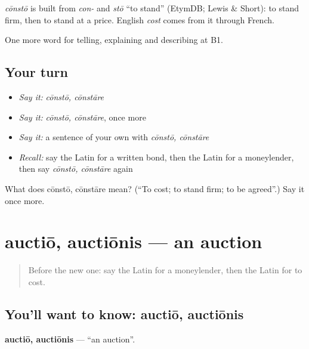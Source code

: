 \begin{cousinweb}
\emph{cōnstō} is built from \emph{con-} and \emph{stō} \textquotedblleft{}to stand\textquotedblright{} (EtymDB; Lewis \& Short): to stand firm, then to stand at a price. English \emph{cost} comes from it through French.
\end{cousinweb}

\begin{grammarlens}[title={What you've built}]
One more word for telling, explaining and describing at B1.
\end{grammarlens}

\subsection*{Your turn}
\begin{itemize}
\raggedright
  \item \emph{Say it:} \emph{cōnstō, cōnstāre}
  \item \emph{Say it:} \emph{cōnstō, cōnstāre}, once more
  \item \emph{Say it:} a sentence of your own with \emph{cōnstō, cōnstāre}
  \item \emph{Recall:} say the Latin for a written bond, then the Latin for a moneylender, then say \emph{cōnstō, cōnstāre} again
\end{itemize}

\begin{tcolorbox}[breakable,colback=teal!4,colframe=teal!35!black,title={Before you move on}]
What does cōnstō, cōnstāre mean? (\textquotedblleft{}To cost; to stand firm; to be agreed\textquotedblright{}.) Say it once more.
\end{tcolorbox}
\section[auctiō, auctiōnis]{auctiō, auctiōnis — an auction}

\label{lesson:LA-C420-auctio}



\begin{quote}
Before the new one: say the Latin for a moneylender, then the Latin for to cost.
\end{quote}

\subsection*{You'll want to know: auctiō, auctiōnis}
\textbf{auctiō, auctiōnis} — \textquotedblleft{}an auction\textquotedblright{}.

